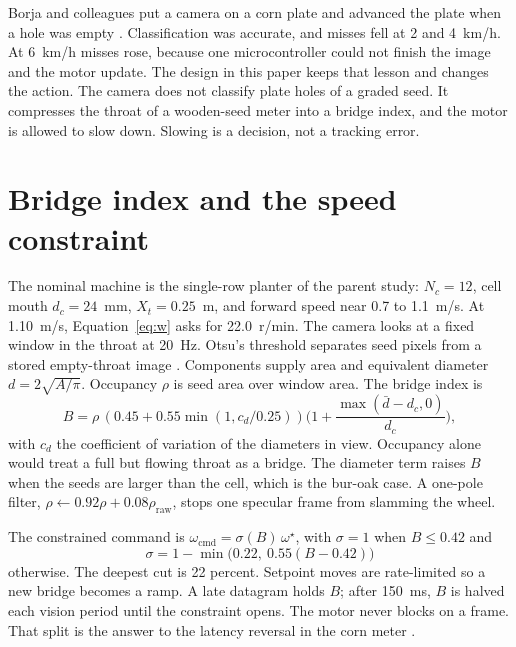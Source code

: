 \documentclass[11pt,a4paper]{article}
\begin{document}
Borja and colleagues put a camera on a corn plate and advanced the plate when a hole was empty \cite{borja2021}. Classification was accurate, and misses fell at 2 and 4~km/h. At 6~km/h misses rose, because one microcontroller could not finish the image and the motor update. The design in this paper keeps that lesson and changes the action. The camera does not classify plate holes of a graded seed. It compresses the throat of a wooden-seed meter into a bridge index, and the motor is allowed to slow down. Slowing is a decision, not a tracking error.

\section{Bridge index and the speed constraint}

The nominal machine is the single-row planter of the parent study: $N_c=12$, cell mouth $d_c=24$~mm, $X_t=0.25$~m, and forward speed near 0.7 to 1.1~m/s. At 1.10~m/s, Equation~\eqref{eq:w} asks for 22.0~r/min. The camera looks at a fixed window in the throat at 20~Hz. Otsu's threshold separates seed pixels from a stored empty-throat image \cite{otsu1979}. Components supply area and equivalent diameter $d=2\sqrt{A/\pi}$. Occupancy $\rho$ is seed area over window area. The bridge index is
\begin{equation}
B = \rho\,(0.45+0.55\min(1,c_d/0.25))\Big(1+\frac{\max(\bar d-d_c,0)}{d_c}\Big),
\label{eq:B}
\end{equation}
with $c_d$ the coefficient of variation of the diameters in view. Occupancy alone would treat a full but flowing throat as a bridge. The diameter term raises $B$ when the seeds are larger than the cell, which is the bur-oak case. A one-pole filter, $\rho\leftarrow 0.92\rho+0.08\rho_{\mathrm{raw}}$, stops one specular frame from slamming the wheel.

The constrained command is $\omega_{\mathrm{cmd}}=\sigma(B)\,\omega^{\star}$, with $\sigma=1$ when $B\le 0.42$ and
\begin{equation}
\sigma = 1-\min\big(0.22,\ 0.55(B-0.42)\big)
\label{eq:sigma}
\end{equation}
otherwise. The deepest cut is 22 percent. Setpoint moves are rate-limited so a new bridge becomes a ramp. A late datagram holds $B$; after 150~ms, $B$ is halved each vision period until the constraint opens. The motor never blocks on a frame. That split is the answer to the latency reversal in the corn meter \cite{borja2021}.
\end{document}

